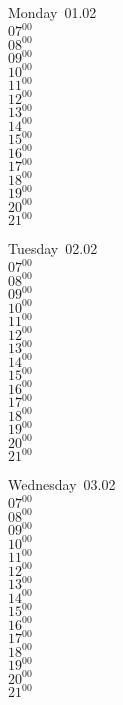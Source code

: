 \documentclass[11pt,a4paper]{book}\usepackage[]{graphicx}\usepackage[]{color}
\begin{document}
\begin{headerbox}
\end{headerbox}
\begin{weekdaybox}
  Monday~01.02\\
  { 
  \vfill
  $07^{00}$\\
$08^{00}$\\
$09^{00}$\\
$10^{00}$\\
$11^{00}$\\
$12^{00}$\\
$13^{00}$\\
$14^{00}$\\
$15^{00}$\\
$16^{00}$\\
$17^{00}$\\
$18^{00}$\\
$19^{00}$\\
$20^{00}$\\
$21^{00}$\\
  }
\end{weekdaybox}
\begin{weekdaybox}
  Tuesday~02.02\\
  { 
  \vfill
  $07^{00}$\\
$08^{00}$\\
$09^{00}$\\
$10^{00}$\\
$11^{00}$\\
$12^{00}$\\
$13^{00}$\\
$14^{00}$\\
$15^{00}$\\
$16^{00}$\\
$17^{00}$\\
$18^{00}$\\
$19^{00}$\\
$20^{00}$\\
$21^{00}$\\
  }
\end{weekdaybox}
\begin{weekdaybox}
  Wednesday~03.02\\
  { 
  \vfill
  $07^{00}$\\
$08^{00}$\\
$09^{00}$\\
$10^{00}$\\
$11^{00}$\\
$12^{00}$\\
$13^{00}$\\
$14^{00}$\\
$15^{00}$\\
$16^{00}$\\
$17^{00}$\\
$18^{00}$\\
$19^{00}$\\
$20^{00}$\\
$21^{00}$\\
  }
\end{weekdaybox}
\end{document}
